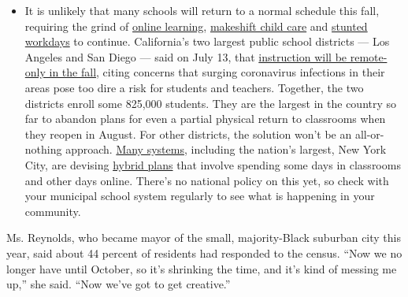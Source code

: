 \begin{itemize}
  \begin{itemize}
  \tightlist
  \item
    It is unlikely that many schools will return to a normal schedule
    this fall, requiring the grind of
    \href{https://www.nytimes3xbfgragh.onion/2020/06/05/us/coronavirus-education-lost-learning.html?action=click\&pgtype=Article\&state=default\&region=MAIN_CONTENT_3\&context=storylines_faq}{online
    learning},
    \href{https://www.nytimes3xbfgragh.onion/2020/05/29/us/coronavirus-child-care-centers.html?action=click\&pgtype=Article\&state=default\&region=MAIN_CONTENT_3\&context=storylines_faq}{makeshift
    child care} and
    \href{https://www.nytimes3xbfgragh.onion/2020/06/03/business/economy/coronavirus-working-women.html?action=click\&pgtype=Article\&state=default\&region=MAIN_CONTENT_3\&context=storylines_faq}{stunted
    workdays} to continue. California's two largest public school
    districts --- Los Angeles and San Diego --- said on July 13, that
    \href{https://www.nytimes3xbfgragh.onion/2020/07/13/us/lausd-san-diego-school-reopening.html?action=click\&pgtype=Article\&state=default\&region=MAIN_CONTENT_3\&context=storylines_faq}{instruction
    will be remote-only in the fall}, citing concerns that surging
    coronavirus infections in their areas pose too dire a risk for
    students and teachers. Together, the two districts enroll some
    825,000 students. They are the largest in the country so far to
    abandon plans for even a partial physical return to classrooms when
    they reopen in August. For other districts, the solution won't be an
    all-or-nothing approach.
    \href{https://bioethics.jhu.edu/research-and-outreach/projects/eschool-initiative/school-policy-tracker/}{Many
    systems}, including the nation's largest, New York City, are
    devising
    \href{https://www.nytimes3xbfgragh.onion/2020/06/26/us/coronavirus-schools-reopen-fall.html?action=click\&pgtype=Article\&state=default\&region=MAIN_CONTENT_3\&context=storylines_faq}{hybrid
    plans} that involve spending some days in classrooms and other days
    online. There's no national policy on this yet, so check with your
    municipal school system regularly to see what is happening in your
    community.
  \end{itemize}
\end{itemize}

Ms. Reynolds, who became mayor of the small, majority-Black suburban
city this year, said about 44 percent of residents had responded to the
census. ``Now we no longer have until October, so it's shrinking the
time, and it's kind of messing me up,'' she said. ``Now we've got to get
creative.''

